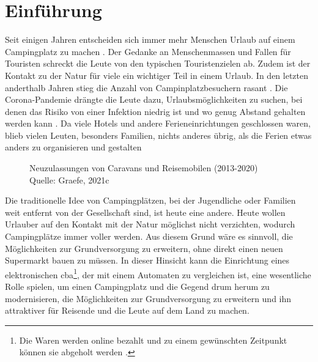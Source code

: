 \section{Einführung}


Seit einigen Jahren entscheiden sich immer mehr Menschen Urlaub auf einem Campingplatz zu machen 
\cite{periodical:ANST}. Der Gedanke an Menschenmassen und Fallen für Touristen schreckt die Leute von 
den typischen Touristenzielen ab. Zudem ist der Kontakt zu der Natur für viele ein wichtiger Teil 
in einem Urlaub. In den letzten anderthalb Jahren stieg die Anzahl von Campinplatzbesuchern rasant
\cite{periodical:UBST}. Die Corona-Pandemie drängte die Leute dazu, Urlaubsmöglichkeiten zu suchen, 
bei denen das Risiko von einer Infektion niedrig ist und wo genug Abstand gehalten werden kann
\cite{periodical:AUST}. Da viele Hotels und andere Ferieneinrichtungen geschlossen waren, blieb 
vielen Leuten, besonders Familien, nichts anderes übrig, als die Ferien etwas anders zu organisieren 
und gestalten 

\vfill
\begin{figure}[H]
    \caption{Neuzulassungen von Caravans und Reisemobilen (2013-2020) \\ Quelle: Graefe, 2021c}
    \label{fig:periodical_ANST}
\end{figure}

Die traditionelle Idee von Campingplätzen, bei der Jugendliche oder Familien weit entfernt von der 
Gesellschaft sind, ist heute eine andere. Heute wollen Urlauber auf den Kontakt mit der Natur
möglichst nicht verzichten, wodurch Campingplätze immer voller werden. Aus diesem Grund wäre es
sinnvoll, die Möglichkeiten zur Grundversorgung zu erweitern, ohne direkt einen neuen Supermarkt
bauen zu müssen. In dieser Hinsicht kann die Einrichtung eines elektronischen \acrfull{cba}\footnote{Die
Waren werden online bezahlt und zu einem gewünschten Zeitpunkt können sie abgeholt werden \cite{refart:ECPG}.},
der mit einem Automaten zu vergleichen ist, eine wesentliche Rolle spielen, um einen Campingplatz und die 
Gegend drum herum zu modernisieren, die Möglichkeiten zur Grundversorgung zu erweitern und ihn attraktiver
für Reisende und die Leute auf dem Land zu machen.


